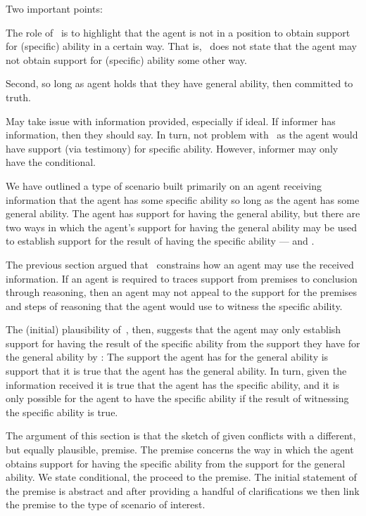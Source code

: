 \hozline{}

\begin{note}
  Two important points:

  The role of~\nI{} is to highlight that the agent is not in a position to obtain support for (specific) ability in a certain way.
  That is,~\nI{} does not state that the agent may not obtain support for (specific) ability some other way.

  Second, so long as agent holds that they have general ability, then committed to truth.

  May take issue with information provided, especially if ideal.
  If informer has information, then they should say.
  In turn, not problem with~\nI{} as the agent would have support (via testimony) for specific ability.
  However, informer may only have the conditional.
\end{note}

\hozline{}


\begin{note}
  We have outlined a type of scenario built primarily on an agent receiving information that the agent has some specific ability so long as the agent has some general ability.
  The agent has support for having the general ability, but there are two ways in which the agent's support for having the general ability may be used to establish support for {\color{red} the result of having the specific ability} --- \AR{} and \WR{}.

  The previous section argued that~\ESU{} constrains how an agent may use the received information.
  If an agent is required to traces support from premises to conclusion through reasoning, then an agent may not appeal to the support for the premises and steps of reasoning that the agent would use to witness the specific ability.

  The (initial) plausibility of~\ESU{}, then, suggests that the agent may only establish support for having the {\color{red} result of the specific ability} from the support they have for the general ability by \AR{}:
  The support the agent has for the general ability is support that it is true that the agent has the general ability.
  In turn, given the information received it is true that the agent has the specific ability, and it is only possible for the agent to have the specific ability if the result of witnessing the specific ability is true.

  The argument of this section is that the sketch of \AR{} given conflicts with a different, but equally plausible, premise.
  The premise concerns the way in which the agent obtains support for having the specific ability from the support for the general ability.
  We state conditional, the proceed to the premise.
  The initial statement of the premise is abstract and after providing a handful of clarifications we then link the premise to the type of scenario of interest.
\end{note}

